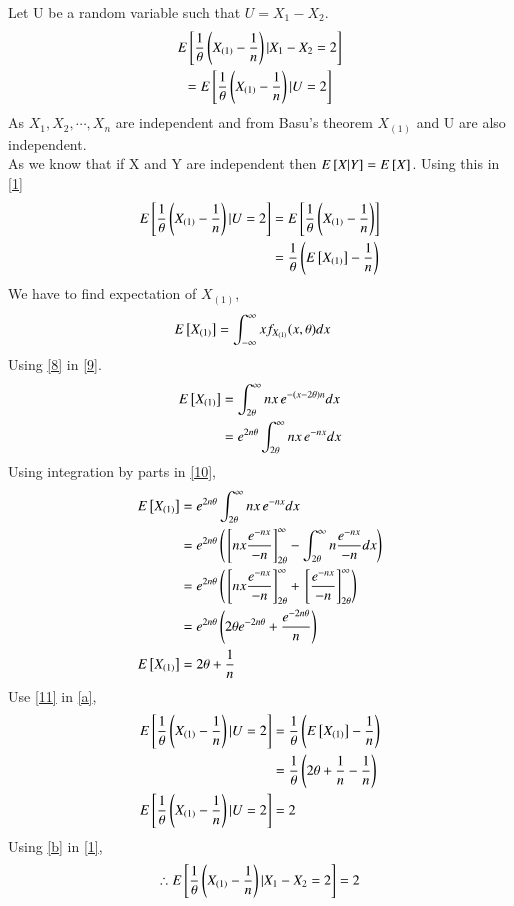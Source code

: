 \documentclass[journal,12pt,twocolumn]{IEEEtran}
\begin{document}
Let U be a random variable such that $U=X_1-X_2$.
\begin{multline}
    E{}\left[ \frac{1}{\theta}\left(X_{(1)}-\frac{1}{n}\right)|X_1-X_2=2 \right]\\=E{}\left[ \frac{1}{\theta}\left(X_{(1)}-\frac{1}{n}\right)|U=2 \right]\label{1}
\end{multline}
As $X_1,X_2,\cdots,X_n$ are independent and from Basu's theorem $X_{(1)}$ and U are also independent. \\As we know that if X and Y are independent then $E{}\left[ X|Y \right]=E{}\left[ X \right]$. 
Using this in \eqref{1}
\begin{align}
    E{}\left[ \frac{1}{\theta}\left(X_{(1)}-\frac{1}{n}\right)|U=2 \right]
    &=E{}\left[ \frac{1}{\theta}\left(X_{(1)}-\frac{1}{n}\right) \right]\\
    &=\frac{1}{\theta}\left(E{}\left[ X_{(1)} \right]-\frac{1}{n}\right)\label{a}
\end{align}
We have to find expectation of $X_{(1)}$,
\begin{align}
   E{}\left[ X_{(1)} \right]&=\int_{-\infty}^{\infty} x f_{X_{(1)}}{(x,\theta)} dx \label{9}
\end{align}
Using \eqref{8} in \eqref{9}.
\begin{align}
\nonumber E{}\left[ X_{(1)} \right]&=\int_{2\theta}^{\infty} n x\,e^{-(x-2\theta)n} dx\\
  &= e^{2n\theta}\int_{2\theta}^{\infty} n x\,e^{-n x} dx \label{10}
\end{align}
Using integration by parts in \eqref{10},
\begin{align}
    \nonumber E{}\left[ X_{(1)} \right]
  &= e^{2n\theta}\int_{2\theta}^{\infty}nx\,e^{-n x}dx\\
      \nonumber &= e^{2n\theta}\left({}\left[n x \frac{e^{-n x}}{-n}\right]_{2\theta}^{\infty}-\int_{2\theta}^{\infty} n \frac{e^{-n x}}{-n}dx\right)\\
  \nonumber &= e^{2n\theta}\left({}\left[n x \frac{e^{-n x}}{-n}\right]_{2\theta}^{\infty}+{}\left[\frac{e^{-n x}}{-n}\right]_{2\theta}^{\infty}\right)\\
  \nonumber &= e^{2n\theta}\left(2\theta e^{-2n\theta}+\frac{e^{-2n\theta}}{n}\right)\\
  E{}\left[ X_{(1)} \right] &= 2\theta+\frac{1}{n}\label{11}
\end{align}
Use \eqref{11} in \eqref{a},
\begin{align}
   \nonumber E{}\left[ \frac{1}{\theta}\left(X_{(1)}-\frac{1}{n}\right)|U=2 \right]
    &=\frac{1}{\theta}\left(E{}\left[ X_{(1)} \right]-\frac{1}{n}\right)\\
   \nonumber &=\frac{1}{\theta}\left(2\theta+\frac{1}{n}-\frac{1}{n}\right)\\
   E{}\left[ \frac{1}{\theta}\left(X_{(1)}-\frac{1}{n}\right)|U=2 \right] &= 2\label{b}
\end{align}
Using \eqref{b} in \eqref{1},
\begin{align}
     \nonumber\therefore   E{}\left[ \frac{1}{\theta}\left(X_{(1)}-\frac{1}{n}\right)|X_1-X_2=2 \right]=2
\end{align}
\end{document}
